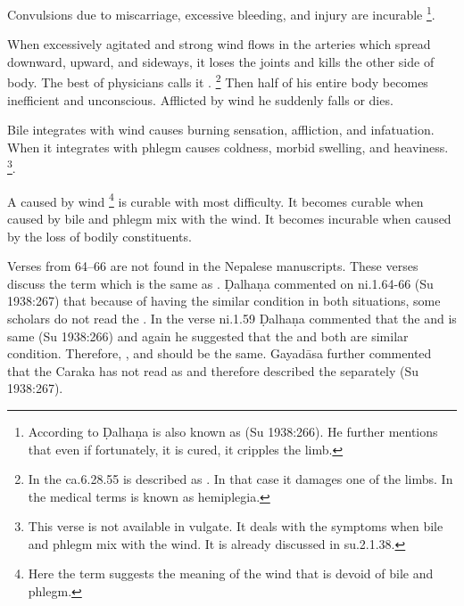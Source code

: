 \begin{translation}
\item[59] Convulsions due to miscarriage, excessive bleeding, and injury are 
incurable \footnote{According to Ḍalhaṇa  is also 
known as 
 (Su 1938:266). He further mentions that even if fortunately, it is 
cured, it cripples the limb.}.

\item[60--62] When excessively agitated and strong wind flows in the arteries 
which spread downward, upward, and sideways, it loses the joints and kills the 
other side of body. The best of physicians calls it . 
\footnote{In the ca.6.28.55  is described as 
. In that case it damages one of the limbs.  In the 
medical terms  is known as hemiplegia.} Then half 
of his entire body becomes inefficient and unconscious. Afflicted by wind he 
suddenly falls or dies.

\item[62.1] Bile integrates with wind causes burning sensation, affliction, and infatuation. When it integrates with phlegm causes coldness, morbid swelling, and heaviness. \footnote{This verse is not available in vulgate. It deals with the symptoms when bile and phlegm mix with the wind. It is already discussed in su.2.1.38.}. 

\item[63] A  caused by wind \footnote{Here the term 
 suggests the meaning of the wind that is devoid of bile and 
phlegm.} is curable with most difficulty. It becomes curable when caused by bile 
and phlegm mix with the wind. It becomes incurable when caused by the loss of 
bodily constituents.

\item[64--66] Verses from 64--66 are not found in the Nepalese manuscripts. 
These verses discuss the term  
which is the same as . Ḍalhaṇa commented on ni.1.64-66 (Su 
1938:267) that because of having the similar condition in both situations, some 
scholars do not read the . In the verse ni.1.59 Ḍalhaṇa 
commented that the  and  is same (Su 1938:266) and 
again he suggested that the  and  both are similar 
condition. Therefore, ,  and  should be 
the same. Gayadāsa further commented that the Caraka has not read 
 as  and therefore described the  
separately (Su 1938:267).


\end{translation}
